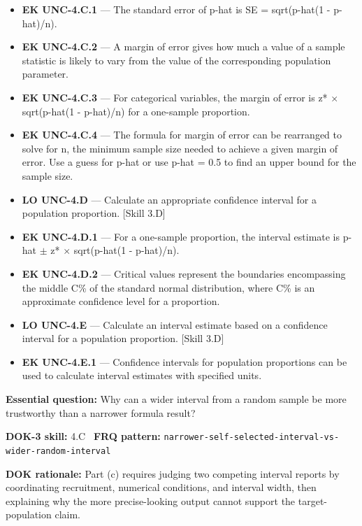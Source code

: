 \documentclass[11pt]{article}
\begin{document}
{\begin{itemize}[leftmargin=1.5em,itemsep=2pt,topsep=2pt]
  \item \textbf{EK UNC-4.C.1} --- The standard error of p-hat is SE = sqrt(p-hat(1 - p-hat)/n).
  \item \textbf{EK UNC-4.C.2} --- A margin of error gives how much a value of a sample statistic is likely to vary from the value of the corresponding population parameter.
  \item \textbf{EK UNC-4.C.3} --- For categorical variables, the margin of error is z* $\times$ sqrt(p-hat(1 - p-hat)/n) for a one-sample proportion.
  \item \textbf{EK UNC-4.C.4} --- The formula for margin of error can be rearranged to solve for n, the minimum sample size needed to achieve a given margin of error. Use a guess for p-hat or use p-hat = 0.5 to find an upper bound for the sample size.
  \item \textbf{LO UNC-4.D} --- Calculate an appropriate confidence interval for a population proportion. [Skill 3.D]
  \item \textbf{EK UNC-4.D.1} --- For a one-sample proportion, the interval estimate is p-hat $\pm$ z* $\times$ sqrt(p-hat(1 - p-hat)/n).
  \item \textbf{EK UNC-4.D.2} --- Critical values represent the boundaries encompassing the middle C\% of the standard normal distribution, where C\% is an approximate confidence level for a proportion.
  \item \textbf{LO UNC-4.E} --- Calculate an interval estimate based on a confidence interval for a population proportion. [Skill 3.D]
  \item \textbf{EK UNC-4.E.1} --- Confidence intervals for population proportions can be used to calculate interval estimates with specified units.
\end{itemize}
}
\textbf{Essential question:} Why can a wider interval from a random sample be more trustworthy than a narrower formula result?\par
\textbf{DOK-3 skill:} 4.C \textperiodcentered\ \textbf{FRQ pattern:} {\small\texttt{narrower-\allowbreak{}self-\allowbreak{}selected-\allowbreak{}interval-\allowbreak{}vs-\allowbreak{}wider-\allowbreak{}random-\allowbreak{}interval}}\par
\textbf{DOK rationale:} Part (c) requires judging two competing interval reports by coordinating recruitment, numerical conditions, and interval width, then explaining why the more precise-looking output cannot support the target-population claim.\par
\end{document}
